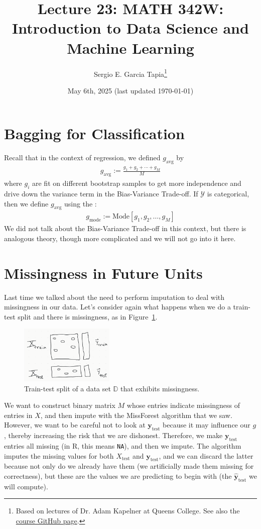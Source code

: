 \documentclass[12pt, a4paper]{article}
\title{Lecture 23: MATH 342W: Introduction to Data Science and Machine Learning}
\author{Sergio E. Garcia Tapia\thanks{Based on lectures of Dr. Adam Kapelner at Queens College.
See also the \href{https://github.com/kapelner/QC_MATH_342W_Spring_2025}{course GitHub page}.}}
\date{May 6th, 2025 (last updated \today)}
\theoremstyle{definition}
\begin{document}
	\maketitle
	\section{Bagging for Classification}
	Recall that in the context of regression, we defined $g_{\text{avg}}$ by
	\begin{align*}
		g_{\text{avg}} := \frac{g_1 + g_2 + \cdots + g_M}{M}
	\end{align*}
	where $g_i$ are fit on different bootstrap samples to get more independence
	and drive down the variance term in the Bias-Variance Trade-off. If
	$\mathcal{Y}$ is categorical, then we define $g_{\text{avg}}$ using
	the :
	\begin{align*}
		g_{\text{mode}} := \text{Mode}[g_1, g_2, \ldots,g_M]
	\end{align*}
	We did not talk about the Bias-Variance Trade-off in this context, but there
	is analogous theory, though more complicated and we will not go into it here.
	\section{Missingness in Future Units}
	Last time we talked about the need to perform imputation to deal with missingness
	in our data. Let's consider again what happens when we do a train-test split
	and there is missingness, as in Figure~\ref{fig:train-test-missing}.
	\begin{figure}
		\centering
		\includegraphics[width=0.4\textwidth]{train-test-split-missingness}
		\caption{Train-test split of a data set $\mathbb{D}$ that exhibits
		missingness.}
		\label{fig:train-test-missing}
	\end{figure}
	We want to construct binary matrix $M$ whose entries indicate missingness of entries
	in $X$, and then impute with the MissForest algorithm that we saw. However,
	we want to be careful not to look at $\bm{y}_{\text{test}}$ because it may
	influence our $g$, thereby increasing the risk that we are dishonest. Therefore,
	we make $\bm{y}_{\text{test}}$ entries all missing (in R, this means \texttt{NA}),
	and then we impute. The algorithm imputes the missing values for both $X_{\text{test}}$
	and $\bm{y}_{\text{test}}$, and we can discard the latter because not only do
	we already have them (we artificially made them missing for correctness), but
	these are the values we are predicting to begin with (the $\hat{\bm{y}}_{\text{test}}$
	we will compute).
	
\end{document}
